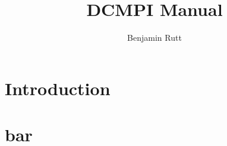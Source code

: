 \documentclass{article}
\begin{document}
\title{DCMPI Manual}
\author{Benjamin Rutt}
\maketitle

\section{Introduction}

\section{bar}
\end{document}
